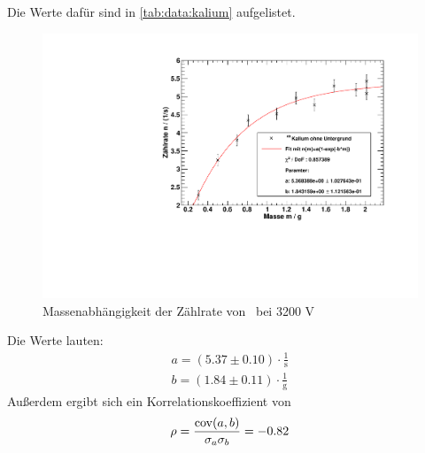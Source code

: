 Die Werte dafür sind in \autoref{tab:data:kalium} aufgelistet.
 
\begin{figure}[H]
\begin{center}
  \includegraphics[width=15cm]{../img/Kalium40_Massenabhaengigkeit.pdf}
  \caption[Massenabhängigkeit der Zählrate von \kalium]{Massenabhängigkeit der Zählrate von \kalium\, bei 3200 V}
  \label{img:kalium:massdep}
\end{center}
\end{figure}
Die Werte lauten:
\begin{gather}
  a = (5.37 \pm 0.10) \cdot \frac{1}{\text{s}} \\ %
  b = (1.84 \pm 0.11) \cdot \frac{1}{\text{g}} 
\end{gather}
Außerdem ergibt sich ein Korrelationskoeffizient von
\begin{equation}
  \rho = \frac{\operatorname{cov}(a, b)}{\sigma_a \sigma_b} = -0.82
\end{equation}

